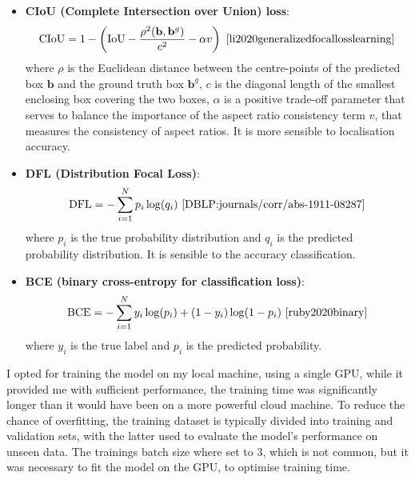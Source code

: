 \begin{itemize}
\item \textbf{CIoU (Complete Intersection over Union) loss}:
\begin{equation}
\text{CIoU} = 1 - \left( \text{IoU} - \frac{\rho^2(\mathbf{b}, \mathbf{b}^g)}{c^2} - \alpha v \right) ~\cite{li2020generalizedfocallosslearning}\label{eq:equation3}
\end{equation}
where \(\rho\) is the Euclidean distance between the centre-points of the predicted box \(\mathbf{b}\) and
 the ground truth box \(\mathbf{b}^g\), \(c\) is the diagonal length of the smallest enclosing box covering
 the two boxes, \(\alpha\) is a positive trade-off parameter that serves to balance the importance of the aspect ratio consistency term \(v\),  that measures the consistency of aspect
 ratios.
 It is more sensible to localisation accuracy.

\item \textbf{DFL (Distribution Focal Loss)}:
\begin{equation}
\text{DFL} = -\sum_{i=1}^{N} p_i \log(q_i)~\cite{DBLP:journals/corr/abs-1911-08287}\label{eq:equation2}
\end{equation}
where \(p_i\) is the true probability distribution and \(q_i\) is the predicted probability distribution.
It is sensible to the accuracy classification.
\item \textbf{BCE (binary cross-entropy for classification loss)}:
\begin{equation}
\text{BCE} = -\sum_{i=1}^{N} y_i \log(p_i) + (1 - y_i) \log(1 - p_i)~\cite{ruby2020binary}\label{eq:equation}
\end{equation}
where \(y_i\) is the true label and \(p_i\) is the predicted probability.

\end{itemize}



I opted for training the model on my local machine, using a single GPU, while it provided me with sufficient performance, the training time was significantly longer than it would have been on a more powerful cloud machine.
To reduce the chance of overfitting, the training dataset is typically divided into training and validation sets,
with the latter used to evaluate the model's performance on unseen data.
The trainings batch size where set to 3, which is not common, but it was necessary to fit the model on the GPU,
to optimise training time.

\newpage